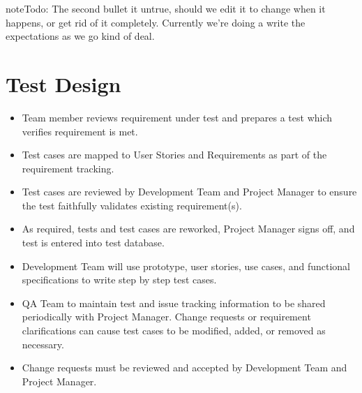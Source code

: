 \documentclass[letterpaper,10pt,english]{sphinxmanual}
\begin{document}
\begin{sphinxadmonition}{note}{\label{test_plan/test_management:index-0}Todo:}
The second bullet it untrue, should we edit it to change when it happens, or get rid of it completely. Currently we’re doing a write the expectations as we go kind of deal.
\end{sphinxadmonition}


\section{Test Design}
\label{\detokenize{test_plan/test_management:test-design}}\begin{itemize}
\item {} 
Team member reviews requirement under test and prepares a test which verifies requirement is met.

\item {} 
Test cases are mapped to User Stories and Requirements as part of the requirement tracking.

\item {} 
Test cases are reviewed by Development Team and Project Manager to ensure the test faithfully validates existing requirement(s).

\item {} 
As required, tests and test cases are reworked, Project Manager signs off, and test is entered into test database.

\item {} 
Development Team will use prototype, user stories, use cases, and functional specifications to write step by step test cases.

\item {} 
QA Team to maintain test and issue tracking information to be shared periodically with Project Manager. Change requests or requirement clarifications can cause test cases to be modified, added, or removed as necessary.

\item {} 
Change requests must be reviewed and accepted by Development Team and Project Manager.

\end{itemize}
\end{document}
